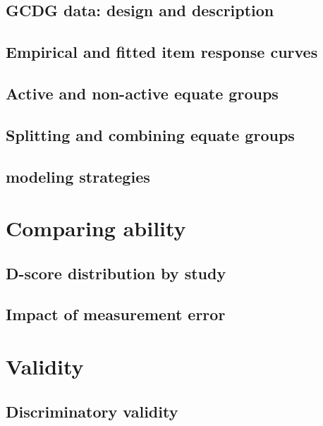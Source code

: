 \documentclass[]{book}
\theoremstyle{definition}
\theoremstyle{definition}
\theoremstyle{definition}
\theoremstyle{remark}
\begin{document}
\section{GCDG data: design and
description}\label{gcdg-data-design-and-description}

\section{Empirical and fitted item response
curves}\label{empirical-and-fitted-item-response-curves}

\section{Active and non-active equate
groups}\label{active-and-non-active-equate-groups}

\section{Splitting and combining equate
groups}\label{splitting-and-combining-equate-groups}

\section{modeling strategies}\label{modeling-strategies}

\chapter{Comparing ability}\label{ch:ability}

\section{D-score distribution by
study}\label{d-score-distribution-by-study}

\section{Impact of measurement error}\label{impact-of-measurement-error}

\chapter{Validity}\label{ch:validity2}

\section{Discriminatory validity}\label{discriminatory-validity}
\end{document}
